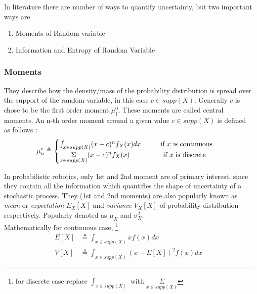 \documentclass[12pt]{report} %
\begin{document}
	In literature there are number of ways to quantify uncertainty, but two important ways are 
	\begin{enumerate}[noitemsep,topsep=0pt]
		\item Moments of Random variable 
		\item Information and Entropy of Random Variable \\
	\end{enumerate}
	\subsubsection*{Moments}
	They describe how the density/mass of the probability distribution is spread over the support of the random variable, in this case $c \in supp(X)$. Generally $c$ is chose to be the first order moment $\mu_1^{0}$. These moments are called central moments. An n-th order moment around a given value $c \in supp(X)$ is defined as follows :
	\begin{equation}
		\mu_{n}^{c} \triangleq 	\begin{cases}
		\int_{x \in supp(X)} (x-c)^n f_X(x) dx \hspace{1cm}\text{if $x$ is continuous}\\
		\underset{x \in supp(X)}{\Sigma} (x-c)^n f_X(x) \hspace{1.7cm} \text{if $x$ is discrete}
		\end{cases}
	\end{equation}
	
	In probabilistic robotics, only 1st and 2nd moment are of primary interest, since they contain all the information which quantifies the shape of uncertainty of a stochastic process. They (1st and 2nd moments) are also popularly known as \textit{mean} or \textit{expectation} $E_X[X]$ and \textit{variance} $V_X[X]$ of probability distribution respectively. Popularly denoted as $\mu_X$ and $\sigma_X^2$. \\
	Mathematically for continuous case, \footnote{for discrete case replace $\int_{x \in supp(X)}$ with $\underset{x \in supp(X)}{\Sigma}$ } 
	\begin{equation*}
	\begin{aligned}
	E[X] &\triangleq \int_{x \in supp(X)} xf(x)dx\\
	V[X] &\triangleq \int_{x \in supp(X)} (x - E[X])^2f(x)dx
	\end{aligned}
	\end{equation*}
	 
\end{document}
